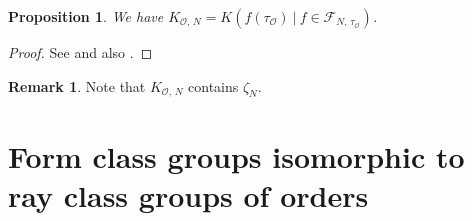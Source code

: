 \documentclass[reqno,11pt]{article}
\theoremstyle{plain} %
\newtheorem{proposition}[theorem]{\indent\sc Proposition}
\theoremstyle{definition} %
\newtheorem{remark}[theorem]{\indent\sc Remark}
\begin{document}
\begin{proposition}\label{generation}
We have 
$K_{\mathcal{O},\,N}=
K\left(f(\tau_\mathcal{O})~|~f\in\mathcal{F}_{N,\,\tau_\mathcal{O}}\right)$.
\end{proposition}
\begin{proof}
See \cite[Theorem 4]{Cho} and also \cite[p. 169]{Stevenhagen}.
\end{proof}

\begin{remark}
Note that $K_{\mathcal{O},\,N}$ contains $\zeta_N$. 
\end{remark}

\section {Form class groups isomorphic to ray class groups of orders}
\end{document}
